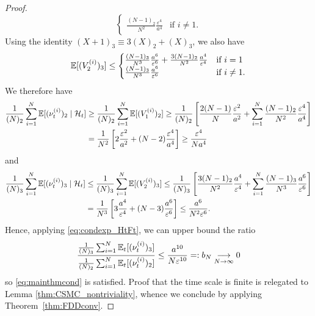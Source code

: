 \begin{proof}
\begin{equation*}
\begin{cases}
\frac{(N-1)_2}{N^2}\frac{\varepsilon^4}{a^4} &\text{if } i\neq 1 .
\end{cases}
\end{equation*}
Using the identity $(X+1)_3 \equiv 3(X)_2 +(X)_3$, we also have
\begin{equation*}
\mathbb{E}[ (V_2^{(i)} )_3 ]
\leq \begin{cases}
\frac{(N-1)_3}{N^3}\frac{a^6}{\varepsilon^6} 
        + \frac{3(N-1)_2}{N^2} \frac{a^4}{\varepsilon^4} &\text{if } i=1 \\
\frac{(N-1)_3}{N^3}\frac{a^6}{\varepsilon^6}  &\text{if } i\neq 1 .
\end{cases}
\end{equation*}
We therefore have
\begin{align}
\frac{1}{(N)_2} \sum_{i=1}^N \mathbb{E}[ (\nu_t^{(i)})_2 \mid \mathcal{H}_t ]
&\geq \frac{1}{(N)_2} \sum_{i=1}^N \mathbb{E}[ ( V_1^{(i)} )_2 ]
\geq \frac{1}{(N)_2} \left[ \frac{2(N-1)}{N} \frac{\varepsilon^2}{a^2}
        + \sum_{i=1}^N \frac{(N-1)_2}{N^2}\frac{\varepsilon^4}{a^4} \right] \notag\\
&= \frac{1}{N^2} \left[ 2 \frac{\varepsilon^2}{a^2} 
        + (N-2) \frac{\varepsilon^4}{a^4} \right]
   \geq \frac{\varepsilon^4}{Na^4} \label{eq:csmc_cN_LB}
\end{align}
and
\begin{align*}
\frac{1}{(N)_3} \sum_{i=1}^N \mathbb{E}[ (\nu_t^{(i)})_3 \mid \mathcal{H}_t ]
&\leq \frac{1}{(N)_3} \sum_{i=1}^N \mathbb{E}[ ( V_2^{(i)} )_3 ]
\leq \frac{1}{(N)_3} \left[ \frac{3(N-1)_2}{N^2} \frac{a^4}{\varepsilon^4}
        + \sum_{i=1}^N \frac{(N-1)_3}{N^3}\frac{a^6}{\varepsilon^6}  \right] \\
&= \frac{1}{N^3} \left[ 3 \frac{a^4}{\varepsilon^4} 
        + (N-3) \frac{a^6}{\varepsilon^6} \right]
    \leq \frac{a^6}{N^2 \varepsilon^6} .
\end{align*}
Hence, applying \eqref{eq:condexp_HtFt}, we can upper bound the ratio
\begin{equation*}
\frac{\frac{1}{(N)_3} \sum_{i=1}^N \mathbb{E}_t[ (\nu_t^{(i)})_3 ]}{\frac{1}{(N)_2} 
        \sum_{i=1}^N \mathbb{E}_t[ (\nu_t^{(i)})_2 ]}
\leq \frac{a^{10}}{N\varepsilon^{10}}
=: b_N 
\underset{N\to\infty}{\longrightarrow} 0
\end{equation*}
so \eqref{eq:mainthmcond} is satisfied. 
Proof that the time scale is finite is relegated to Lemma \ref{thm:CSMC_nontriviality}, whence we conclude by applying Theorem~\ref{thm:FDDconv}.



\end{proof}
